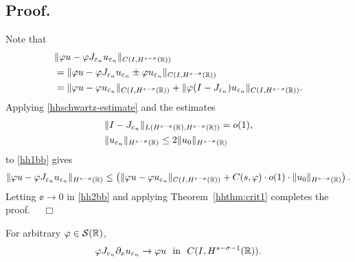 \subsection{Proof.} Note that
\begin{equation}
\begin{split}
& \|\varphi u - \varphi J_{\varepsilon_n} u_{\varepsilon_n}
\|_{C(I, H^{s-\sigma}(\mathbb{R}))}
\\
&= \|\varphi u - \varphi J_{\varepsilon_n} u_{\varepsilon_n} \pm \varphi
u_{\varepsilon_n} \|_{C(I, H^{s-\sigma}(\mathbb{R}))}
\\
& = \|\varphi u - \varphi u_{\varepsilon_n}
\|_{C(I, H^{s-\sigma}(\mathbb{R}))} + \|\varphi (I - J_{\varepsilon_n})
u_{\varepsilon_n} \|_{C(I, H^{s-\sigma}(\mathbb{R}))}.
\label{hh1bb}
\end{split}
\end{equation}
Applying \eqref{hhschwartz-estimate} and the estimates
\begin{equation*}
\begin{split}
& \|I-J_{\varepsilon_n} \|_{L(H^{s-\sigma}(\mathbb{R}), H^{s -
\sigma}(\mathbb{R}))} = o(1),
\\
& \|u_{\varepsilon_n}\|_{H^{s-\sigma}(\mathbb{R})} \le 2
\|u_0\|_{H^{s-\sigma}(\mathbb{R})}
\end{split}
\end{equation*}
to \eqref{hh1bb} gives
\begin{equation}
\label{hh2bb}
\begin{split}
\|\varphi u - \varphi J_{\varepsilon_n} u_{\varepsilon_n}\|_{H^{s-\sigma}(\mathbb{R})}
\le \left( \|\varphi u - \varphi u_{\varepsilon_n}
\|_{C(I, H^{s-\sigma}(\mathbb{R}))} + C(s, \varphi) \cdot o(1) \cdot \|u_0
\|_{H^{s-\sigma}(\mathbb{R})} \right).
\end{split}
\end{equation}
Letting $\ee \to 0$ in \eqref{hh2bb} and applying Theorem~\ref{hhthm:crit1} completes the proof. $\quad \Box$
%
%
\begin{proposition}
\label{hhprop:dd}
For arbitrary $ \varphi \in \mathcal{S}(\mathbb{R})$,
\begin{equation}
\begin{split}
\varphi J_{\varepsilon_n} \partial_x u_{\varepsilon_n} \to \varphi u \ \
\text{in} \ \ C(I, H^{s-\sigma-1}(\mathbb{R})).
\label{hh0dd}
\end{split}
\end{equation}
\end{proposition}
